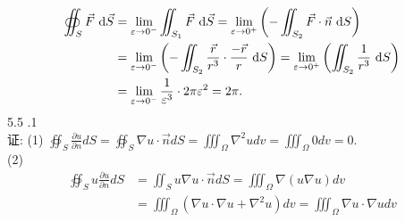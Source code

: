 \documentclass[a4paper,11pt,UTF8]{article}
\begin{document}
$$\\
\begin{aligned}
	\oiint_S \vec{F} \mathrm{~d} \vec{S} & =\lim _{\varepsilon \rightarrow 0^{-}} \iint_{S_1} \vec{F} \mathrm{~d} \vec{S}=\lim _{\varepsilon \rightarrow 0^{+}}\left(-\iint_{S_2} \vec{F} \cdot \vec{n} \mathrm{~d} S\right) \\
	& =\lim _{\varepsilon \rightarrow 0^{-}}\left(-\iint_{S_2} \frac{\vec{r}}{r^3} \cdot \frac{-\vec{r}}{r} \mathrm{~d} S\right)=\lim _{\varepsilon \rightarrow 0^{+}}\left(\iint_{S_2} \frac{1}{r^3} \mathrm{~d} S\right) \\
	& =\lim _{\varepsilon \rightarrow 0^{-}} \frac{1}{\varepsilon^3} \cdot 2 \pi \varepsilon^2=2 \pi .
\end{aligned}
$$
5.5 .1\\
证: (1) $\oiint_S \frac{\partial u}{\partial n} d S=\oiint_S \nabla u \cdot \vec{n} d S=\iiint_{\Omega} \nabla^2 u d v=\iiint_{\Omega} 0 d v=0$.\\
(2)
$$
\begin{aligned}
	\oiint_S u \frac{\partial u}{\partial n} d S & =\iint_S u \nabla u \cdot \vec{n} d S=\iiint_{\Omega} \nabla(u \nabla u) d v \\
	& =\iiint_{\Omega}\left(\nabla u \cdot \nabla u+\nabla^2 u\right) d v=\iiint_{\Omega} \nabla u \cdot \nabla u d v
\end{aligned}
$$
\end{document}
